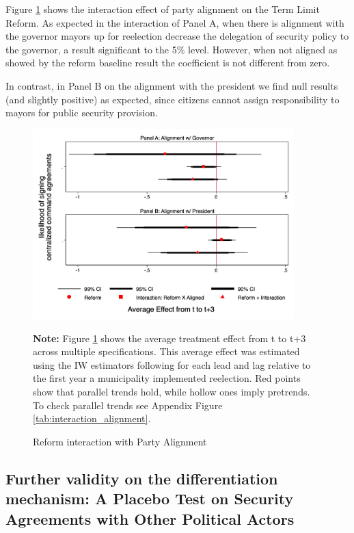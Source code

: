 Figure \ref{fig:alignment} shows the interaction effect of party alignment on the Term Limit Reform. As expected in the interaction of Panel A, when there is alignment with the governor mayors up for reelection decrease the delegation of security policy to the governor, a result significant to the 5\% level. However, when not aligned as showed by the reform baseline result the coefficient is not different from zero. 

In contrast, in Panel B on the alignment with the president we find null results (and slightly positive) as expected, since citizens cannot assign responsibility to mayors for public security provision. 

\begin{figure}[h]   
\centering
 \caption{Reform interaction with Party Alignment}
 \label{fig:alignment}
\includegraphics[width=0.9\textwidth]{Figures/interaction_alignment_full.png}
       \captionsetup{justification=centering}
       
 \textbf{Note:} Figure \ref{fig:alignment} shows the average treatment effect from t to t+3 across multiple specifications. This average effect was estimated using the IW estimators following \citet{abraham_sun_2020} for each lead and lag relative to the first year a municipality implemented reelection. Red points show that parallel trends hold, while hollow ones imply pretrends. To check parallel trends see Appendix Figure \ref{tab:interaction_alignment}.  
\end{figure}  
	
\subsection{Further validity on the differentiation mechanism: A Placebo Test on Security Agreements with Other Political Actors}


